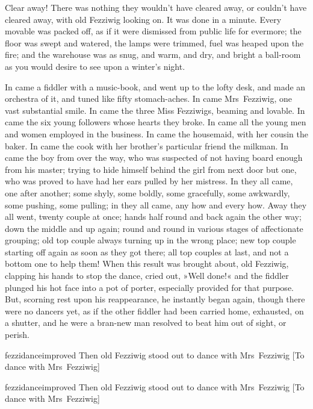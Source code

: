 Clear away! There was nothing they wouldn't have cleared away, or couldn't have cleared away, with old Fezziwig looking on. It was done in a minute. Every movable was packed off, as if it were dismissed from public life for evermore; the floor was swept and watered, the lamps were trimmed, fuel was heaped upon the fire; and the warehouse was as snug, and warm, and dry, and bright a ball-room as you would desire to see upon a winter's night.

In came a fiddler with a music-book, and went up to the lofty desk, and made an orchestra of it, and tuned like fifty stomach-aches. In came Mrs~Fezziwig, one vast substantial smile. In came the three Miss Fezziwigs, beaming and lovable. In came the six young followers whose hearts they broke. In came all the young men and women employed in the business. In came the housemaid, with her cousin the baker. In came the cook with her broth\-er's particular friend the milkman. In came the boy from over the way, who was suspected of not having board enough from his master; trying to hide himself behind the girl from next door but one, who was proved to have had her ears pulled by her mistress. In they all came, one after another; some shyly, some boldly, some gracefully, some awkwardly, some pushing, some pulling; in they all came, any how and every how. Away they all went, twenty couple at once; hands half round and back again the other way; down the middle and up again; round and round in various stages of affectionate grouping; old top couple always turning up in the wrong place; new top couple starting off again as soon as they got there; all top couples at last, and not a bottom one to help them! When this result was brought about, old Fezziwig, clapping his hands to stop the dance, cried out, »Well done!« and the fiddler plunged his hot face into a pot of porter, especially provided for that purpose. But, scorning rest upon his reappearance, he instantly began again, though there were no dancers yet, as if the other fiddler had been carried home, exhausted, on a shutter, and he were a bran-new man resolved to beat him out of sight, or perish.

\begin{letter}
\begin{colorbigpic}
	[1.2]
	{fezzidanceimproved}
	{Then old Fezziwig stood out to dance with Mrs~Fezziwig}
	[To dance with Mrs~Fezziwig]
\end{colorbigpic}
\end{letter}

\begin{a4}
\begin{colorbigpic}
	[1.1]
	{fezzidanceimproved}
	{Then old Fezziwig stood out to dance with Mrs~Fezziwig}
	[To dance with Mrs~Fezziwig]
\end{colorbigpic}
\end{a4}

